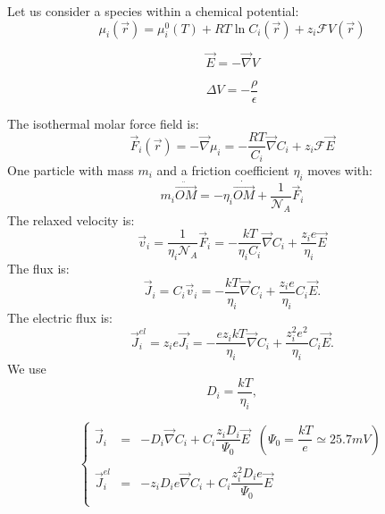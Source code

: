 \documentclass[aps,12pt]{revtex4}
\newcommand{\grad}{\vec{\nabla}}
\begin{document}
Let us consider a species within a chemical potential:
\begin{equation}
	\mu_i(\vec{r}) = \mu_i^0(T) + RT \ln C_i(\vec{r}) +  z_i \mathcal{F} V(\vec{r})
\end{equation}

\begin{equation}
	\vec{E} = -\grad V
\end{equation}

\begin{equation}
	\Delta V = -\dfrac{\rho}{\epsilon}
\end{equation}

The isothermal molar force field is:
\begin{equation}
	\vec{F}_i(\vec{r}) = -\grad \mu_{i} = -\frac{RT}{C_i} \grad C_i + z_i \mathcal{F} \vec{E}
\end{equation}
One particle with mass $m_i$ and a friction coefficient $\eta_i$ moves with:
\begin{equation}
	m_i  \ddot{\vec{OM}} = -\eta_i  \dot{\vec{OM}} + \dfrac{1}{\mathcal{N}_A} \vec{F}_i
\end{equation}
The relaxed velocity is:
\begin{equation}
	\vec{v}_i = \dfrac{1}{\eta_i\mathcal{N}_A} \vec{F}_i = -\dfrac{kT}{\eta_i C_i} \grad C_i + \frac{z_i e}{\eta_i} \vec{E}
\end{equation}
The flux is:
\begin{equation}
	\vec{J}_i = C_i \vec{v}_i = -\dfrac{kT}{\eta_i} \grad C_i + \dfrac{z_i e}{\eta_i} C_i \vec{E}.
\end{equation}
The electric flux is:
\begin{equation}
	\vec{J}^{el}_i = z_i e \vec{J_i} = -\dfrac{ez_ikT}{\eta_i} \grad C_i + \dfrac{z_i^2 e^2}{\eta_i} C_i \vec{E}.
\end{equation}
We use
\begin{equation}
	D_i = \dfrac{kT}{\eta_i}, 
\end{equation}

\begin{equation}
\left\lbrace
\begin{array}{rcl}
\vec{J}_i & = &  -D_i \grad C_i + C_i \dfrac{z_i D_i}{\Psi_0}  \vec{E} \;\; (\Psi_0=\dfrac{kT}{e}\simeq 25.7 mV)\\
\\
\vec{J}^{el}_i & = & - z_i D_i e  \grad C_i + C_i \dfrac{z_i^2 D_i e}{\Psi_0}  \vec{E} \\
\end{array}
\right.
\end{equation}
\end{document}
